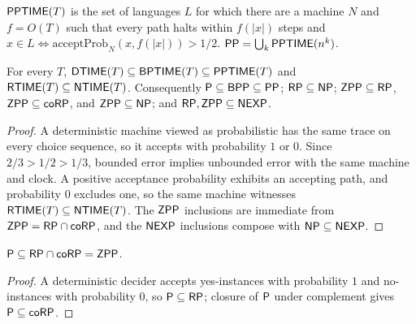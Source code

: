 \begin{definition}[$\cc{PP}$]
  \label{def:PP}
  \leanok
  $\mathsf{PPTIME}(T)$ is the set of languages $L$ for which there are a machine
  $N$ and $f = O(T)$ such that every path halts within $f(|x|)$ steps and
  $x \in L \iff \mathrm{acceptProb}_N(x, f(|x|)) > 1/2$.
  $\mathsf{PP} = \bigcup_k \mathsf{PPTIME}(n^k)$.
\end{definition}

\begin{theorem}
  \label{thm:randomness-containments}
  \leanok
  For every $T$, $\mathsf{DTIME}(T) \subseteq \mathsf{BPTIME}(T) \subseteq
  \mathsf{PPTIME}(T)$ and $\mathsf{RTIME}(T) \subseteq \mathsf{NTIME}(T)$. Consequently
  $\mathsf{P} \subseteq \mathsf{BPP} \subseteq \mathsf{PP}$; $\mathsf{RP} \subseteq \mathsf{NP}$;
  $\mathsf{ZPP} \subseteq \mathsf{RP}$, $\mathsf{ZPP} \subseteq \mathsf{coRP}$, and
  $\mathsf{ZPP} \subseteq \mathsf{NP}$; and $\mathsf{RP}, \mathsf{ZPP} \subseteq \mathsf{NEXP}$.
\end{theorem}
\begin{proof}
  \leanok
  A deterministic machine viewed as probabilistic has the same trace on every
  choice sequence, so it accepts with probability $1$ or $0$. Since
  $2/3 > 1/2 > 1/3$, bounded error implies unbounded error with the same
  machine and clock. A positive acceptance probability exhibits an accepting
  path, and probability $0$ excludes one, so the same machine witnesses
  $\mathsf{RTIME}(T) \subseteq \mathsf{NTIME}(T)$. The $\mathsf{ZPP}$ inclusions are
  immediate from $\mathsf{ZPP} = \mathsf{RP} \cap \mathsf{coRP}$, and the $\mathsf{NEXP}$
  inclusions compose with $\mathsf{NP} \subseteq \mathsf{NEXP}$.
\end{proof}

\begin{theorem}
  \label{thm:randomness-P-subset-ZPP}
  $\mathsf{P} \subseteq \mathsf{RP} \cap \mathsf{coRP} = \mathsf{ZPP}$.
\end{theorem}
\begin{proof}
  A deterministic decider accepts yes-instances with probability $1$ and
  no-instances with probability $0$, so $\mathsf{P} \subseteq \mathsf{RP}$; closure of
  $\mathsf{P}$ under complement gives $\mathsf{P} \subseteq \mathsf{coRP}$.
\end{proof}

